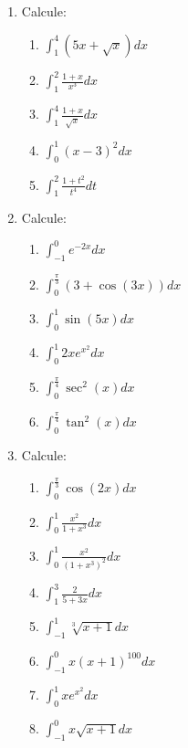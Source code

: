 \documentclass[oneside,a4paper,12pt]{article}
\begin{document}
\begin{enumerate}
	\item Calcule:
	\begin{multicols}{2}
		\begin{enumerate}
			\item $\displaystyle \int_{1}^{4}(5x + \sqrt{x})dx$
			\item $\displaystyle \int_{1}^{2}\frac{1+x}{x^3}dx$
			\item $\displaystyle \int_{1}^{4}\frac{1 + x}{\sqrt{x}}dx$
			\item $\displaystyle \int_{0}^{1}(x-3)^2dx$
			\item $\displaystyle \int_{1}^{2}\frac{1+t^2}{t^4}dt$
		\end{enumerate}
	\end{multicols}	

	\item Calcule:
	\begin{multicols}{2}
		\begin{enumerate}
			\item $\displaystyle \int_{-1}^{0}e^{-2x}dx$
			\item $\displaystyle \int_{0}^{\frac{\pi}{3}}(3 + \cos(3x))dx$
			\item $\displaystyle \int_{0}^{1}\sin(5x)dx$
			\item $\displaystyle \int_{0}^{1}2xe^{x^2}dx$
			\item $\displaystyle \int_{0}^{\frac{\pi}{4}}\sec^2(x)dx$
			\item $\displaystyle \int_{0}^{\frac{\pi}{4}}\tan^2(x)dx$
		\end{enumerate}
	\end{multicols}

	\item Calcule:
	\begin{multicols}{2}
		\begin{enumerate}
			\item $\displaystyle \int_{0}^{\frac{\pi}{3}}\cos(2x)dx$
			\item $\displaystyle \int_{0}^{1}\frac{x^2}{1+x^3}dx$
			\item $\displaystyle \int_{0}^{1}\frac{x^2}{(1+x^3)^2}dx$
			\item $\displaystyle \int_{1}^{3}\frac{2}{5+3x}dx$
			\item $\displaystyle \int_{-1}^{1}\sqrt[3]{x+1}dx$
			\item $\displaystyle \int_{-1}^{0}x(x+1)^{100} dx$
			\item $\displaystyle \int_{0}^{1}xe^{x^2}dx$
			\item $\displaystyle \int_{-1}^{0}x\sqrt{x+1}dx$
		\end{enumerate}
	\end{multicols}


\end{enumerate}
\end{document}
